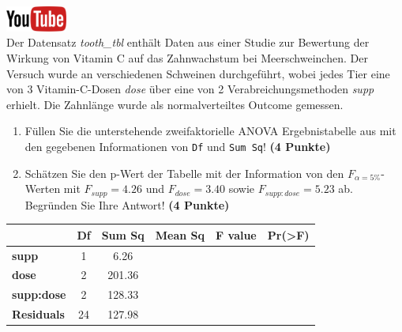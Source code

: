 \documentclass[a4paper, 10pt]{scrartcl}\usepackage[]{graphicx}\usepackage[]{xcolor}
\begin{document}
\hfill\href{https://youtu.be/8Pb2sKUIMyk}{\includegraphics[width =
  2cm]{img/youtube}}\\[1Ex]



Der Datensatz \textit{tooth\_tbl} enth{\"a}lt Daten aus einer Studie zur
Bewertung der Wirkung von Vitamin C auf das Zahnwachstum bei
Meerschweinchen. Der Versuch wurde an verschiedenen Schweinen durchgef{\"u}hrt,
wobei jedes Tier eine von 3 Vitamin-C-Dosen \textit{dose}
{\"u}ber eine von 2 Verabreichungsmethoden \textit{supp}
erhielt. Die Zahnl{\"a}nge wurde als normalverteiltes Outcome gemessen.



\begin{enumerate}
\item F{\"u}llen Sie die unterstehende zweifaktorielle ANOVA Ergebnistabelle aus
  mit den gegebenen Informationen von \texttt{Df} und \texttt{Sum Sq}!
  \textbf{(4 Punkte)}
\item Sch{\"a}tzen Sie den p-Wert der Tabelle mit der Information von den
  $F_{\alpha = 5\%}$-Werten mit
  $F_{supp} = 4.26$ und
  $F_{dose} = 3.40$ sowie
  $F_{supp:dose} = 5.23$ ab. Begr{\"u}nden Sie Ihre
  Antwort! \textbf{(4 Punkte)}
\end{enumerate}

\vspace{1Ex}

\begin{center}
  \Large
  \begin{tabular}{l|c|c|c|c|c}
     & \textbf{Df} & \textbf{Sum Sq} & \textbf{Mean Sq} & \textbf{F value} & \textbf{Pr(>F)} \strut\\
    \hline
   \textbf{supp}  & 1 & 6.26 &  &  &  \strut\\
    \hline
    \textbf{dose}  & 2 & 201.36 &  &  &  \strut\\
    \hline
    \textbf{supp:dose}  & 2 & 128.33 &  &  &  \strut\\
    \hline
   \textbf{Residuals}  & 24 & 127.98 &  &  &  \strut\\
  \end{tabular}
\end{center}

\vspace{1Ex}
\end{document}
